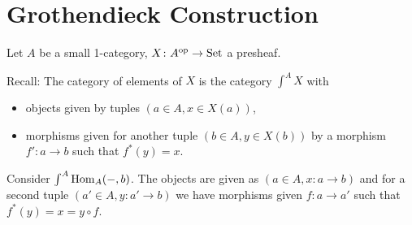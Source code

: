 \section{Grothendieck Construction}

Let $ A $ be a small 1-category, $ X \colon A^{ \operatorname{op} } \to \operatorname{Set} $ a presheaf.

Recall: 
The category of elements of $ X $ is the category 
$ \int^A X $ with 
\begin{itemize}
	\item 
	objects given by tuples $ ( a \in A , x \in X ( a ) ) $,
	
	\item 
	morphisms given for another tuple $ ( b \in A , y \in X ( b ) ) $
	by a morphism $ f' \colon a \to b$ such that $ f^* ( y ) = x $. 
\end{itemize}

\begin{exmp}	
	Consider $ \int^A \operatorname{Hom}_A (- , b ) $.
	The objects are given as $ ( a \in A , x \colon a \to b ) $ 
	and for a second tuple $ ( a' \in A , y \colon a' \to b ) $
	we have morphisms given $ f \colon a \to a' $ such that $ f^* ( y ) = x = y \circ f $.
\end{exmp}

